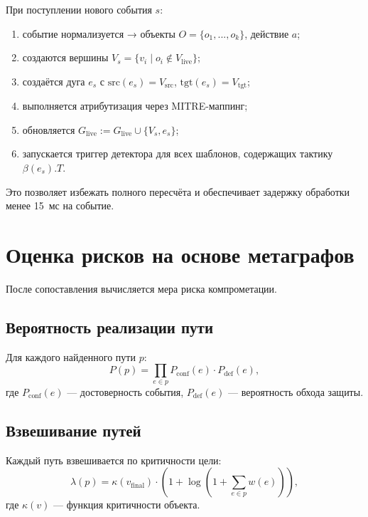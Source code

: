 При поступлении нового события $s$:
\begin{enumerate}
    \item событие нормализуется → объекты $O = \{o_1, ..., o_k\}$, действие $a$;
    \item создаются вершины $V_s = \{v_i \mid o_i \notin V_{\text{live}}\}$;
    \item создаётся дуга $e_s$ с $\text{src}(e_s) = V_{\text{src}}$, $\text{tgt}(e_s) = V_{\text{tgt}}$;
    \item выполняется атрибутизация через MITRE-маппинг;
    \item обновляется $G_{\text{live}} := G_{\text{live}} \cup \{V_s, e_s\}$;
    \item запускается триггер детектора для всех шаблонов, содержащих тактику $\beta(e_s).T$.
\end{enumerate}

Это позволяет избежать полного пересчёта и обеспечивает задержку обработки менее 15~мс на событие.

\section{Оценка рисков на основе метаграфов}

После сопоставления вычисляется мера риска компрометации.

\subsection{Вероятность реализации пути}

Для каждого найденного пути $p$:
\begin{equation}
P(p) = \prod_{e \in p} P_{\text{conf}}(e) \cdot P_{\text{def}}(e),
\label{eq:path_prob}
\end{equation}
где $P_{\text{conf}}(e)$ — достоверность события, $P_{\text{def}}(e)$ — вероятность обхода защиты.

\subsection{Взвешивание путей}

Каждый путь взвешивается по критичности цели:
\begin{equation}
\lambda(p) = \kappa(v_{\text{final}}) \cdot \left(1 + \log \left(1 + \sum_{e \in p} w(e)\right)\right),
\label{eq:path_weight}
\end{equation}
где $\kappa(v)$ — функция критичности объекта.

